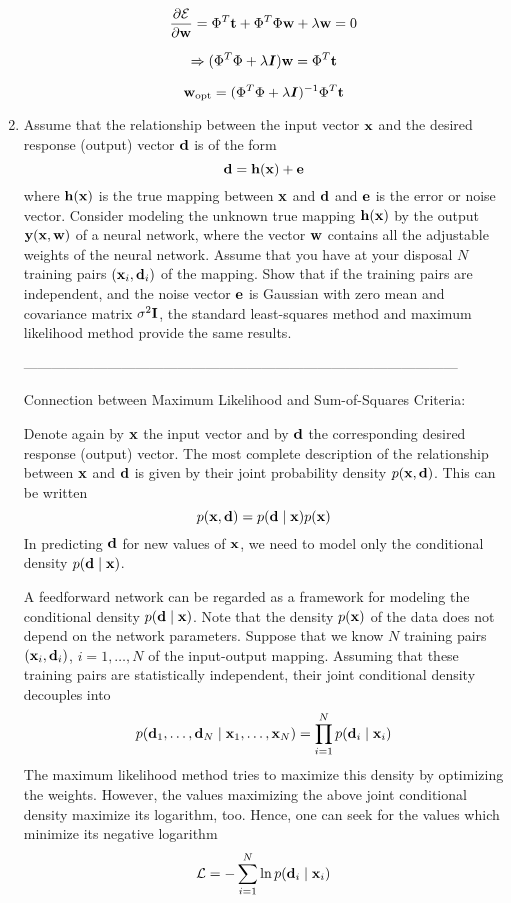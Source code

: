 \documentclass[10pt]{article}
\newcommand{\vect}[1]{{\bf{#1}}}
\newcommand{\matr}[1]{\boldsymbol{#1}}
\begin{document}
\begin{enumerate}
\[
\frac{\partial \mathcal{E}}{\partial \vect{w}} = \Phi^T \vect{t} + \Phi^T
\Phi \vect{w} + \lambda \vect{w} = 0
\]

\[
\Rightarrow (\Phi^T \Phi + \lambda \matr{I})\vect{w} = \Phi^T \vect{t}
\]

\[
\vect{w}_{\text{opt}} = (\Phi^T \Phi + \lambda \matr{I})^{-1}\Phi^T \vect{t}
\]


\vspace{2mm}

\vspace{2cm}
\item Assume that the relationship between the input vector ${\bf x}$
  and the desired response (output) vector ${\bf d}$ is of the form
  \[{\bf d} = {\bf h}({\bf x}) + {\bf e}\]
  where ${\bf h}({\bf x})$ is the true mapping between ${\bf x}$ and ${\bf d}$
  and ${\bf e}$ is the error or noise vector. Consider modeling the unknown
  true mapping ${\bf h}({\bf x})$ by the output ${\bf y}({\bf x},{\bf w})$
  of a neural network, where the vector ${\bf w}$ contains all the adjustable
  weights of the neural network. Assume that you have at your disposal
  $N$ training pairs $({\bf x}_i,{\bf d}_i)$ of the mapping. Show that if the
  training pairs are independent, and the noise vector ${\bf e}$
  is Gaussian with zero mean and covariance matrix $\sigma^2 {\bf I}$, the standard
  least-squares method and maximum likelihood method provide the same results.

---------------------------------------------------------------------------------------------

Connection between Maximum Likelihood and Sum-of-Squares Criteria:

Denote again by ${\bf x}$ the input vector and by ${\bf d}$ the
corresponding desired response (output) vector. The most complete description of the relationship between
${\bf x}$ and ${\bf d}$ is given by their joint probability density
$p({\bf x},{\bf d})$.
This can be written
\[
p({\bf x},{\bf d}) = p({\bf d} \mid {\bf x}) p({\bf x})
\]
In predicting ${\bf d}$ for new values of ${\bf x}$, we need to
model only the conditional density $p({\bf d} \mid {\bf x})$.


A feedforward network can be regarded as a framework for modeling
the conditional density $p({\bf d} \mid {\bf x})$. Note that the density $p({\bf x})$ of the data does not depend
on the network parameters. Suppose that we know $N$ training pairs $({\bf x}_i,{\bf d}_i)$,
$i=1,\ldots,N$ of the input-output mapping. Assuming that these training pairs are statistically independent,
their joint conditional density decouples into
\[
p({\bf d}_1,\ldots,{\bf d}_N \mid {\bf x}_1,\ldots,{\bf x}_N) =
\prod_{i=1}^N p({\bf d}_i \mid {\bf x}_i)
\]
The maximum likelihood method tries to maximize this density by optimizing the weights.
However, the values maximizing the above joint conditional density maximize
its logarithm, too. Hence, one can seek for the values which minimize its
negative logarithm
\[
{\cal L} = - \sum_{i=1}^N \ln p({\bf d}_i \mid {\bf x}_i)
\]


\end{enumerate}
\end{document}
